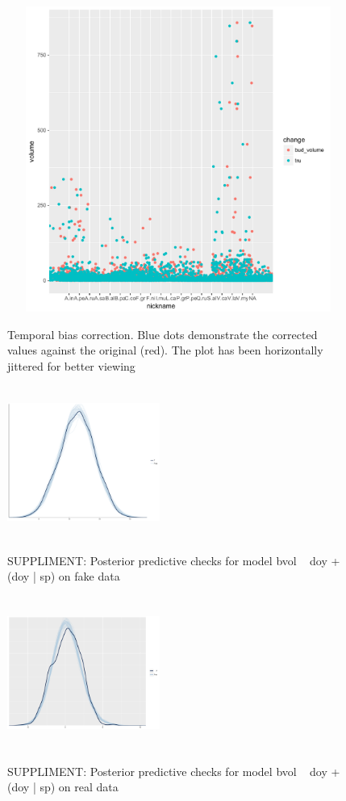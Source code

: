 \documentclass{article}\usepackage[]{graphicx}\usepackage[]{color}
\begin{document}
\begin{figure}[h!]
\includegraphics[width=15cm, height=10cm]{tru_vs_measured_partial.pdf}\\
\caption{Temporal bias correction. Blue dots demonstrate the corrected values against the original (red). The plot has been horizontally jittered for better viewing}
\end{figure}

\begin{figure}[h!]
\includegraphics[width=5cm, height=5cm]{fake_data_pp_check_final.pdf}\\
\caption{SUPPLIMENT: Posterior predictive checks for model bvol ~ doy + (doy | sp) on fake data}
\end{figure}

\begin{figure}[h!]
\includegraphics[width=5cm, height=5cm]{pp_check_log_real.pdf}\\
\caption{SUPPLIMENT: Posterior predictive checks for model bvol ~ doy + (doy | sp) on real data}
\end{figure}
\end{document}
